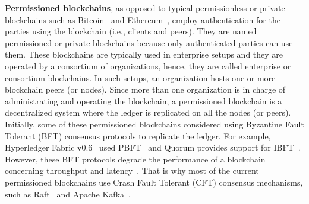 \documentclass[11pt]{article}
\begin{document}
\begin{table}[tp]
    \centering
    \caption{Categories, Features, and Examples.}
    \label{tab:class}
\end{table}

\textbf{Permissioned blockchains}, as opposed to typical permissionless or private blockchains such as Bitcoin~\cite{Bitcoin_2008} and Ethereum~\cite{Ethereum_2013}, employ authentication for the parties using the blockchain (i.e., clients and peers). They are named permissioned or private blockchains because only authenticated parties can use them. These blockchains are typically used in enterprise setups and they are operated by a consortium of organizations, hence, they are called enterprise or consortium blockchains. In such setups, an organization hosts one or more blockchain peers (or nodes). Since more than one organization is in charge of administrating and operating the blockchain, a permissioned blockchain is a decentralized system where the ledger is replicated on all the nodes (or peers). Initially, some of these permissioned blockchains considered using Byzantine Fault Tolerant (BFT) consensus protocols to replicate the ledger. For example, Hyperledger Fabric v0.6~\cite{anh_tkde18, anh_sigmod17} used PBFT~\cite{pbft} and Quorum provides support for IBFT~\cite{ibft}. However, these BFT protocols degrade the performance of a blockchain concerning throughput and latency~\cite{anh_sigmod17, loghin_green2019}. That is why most of the current permissioned blockchains use Crash Fault Tolerant (CFT) consensus mechanisms, such as Raft~\cite{raft} and Apache Kafka~\cite{kafka_site}.
\end{document}
